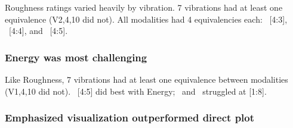     Roughness ratings varied heavily by vibration.
    7 vibrations had at least one equivalence (V2,4,10 did not).
    All modalities had 4 equivalencies each:
    \linear\ [4:3], \original\ [4:4], and \lofi\ [4:5]. 
    
          \subsubsection{Energy was most challenging}
          Like Roughness, 7 vibrations had at least one equivalence  between  modalities (V1,4,10 did not).
          \lofi\ [4:5] did best with Energy;
          \linear\ and \original\ struggled at [1:8]. 
          
          

    
    
    \subsubsection{Emphasized visualization outperformed direct plot}


